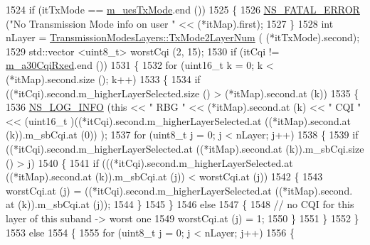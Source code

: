\begin{DoxyCode}
1524       \textcolor{keywordflow}{if} (itTxMode == \hyperlink{classns3_1_1PssFfMacScheduler_a48aa1d9dc22e9c73e3c2206be76bb6cd}{m\_uesTxMode}.end ())
1525         \{
1526           \hyperlink{group__fatal_ga5131d5e3f75d7d4cbfd706ac456fdc85}{NS\_FATAL\_ERROR} (\textcolor{stringliteral}{"No Transmission Mode info on user "} << (*itMap).first);
1527         \}
1528       \textcolor{keywordtype}{int} nLayer = \hyperlink{classns3_1_1TransmissionModesLayers_a31f608b7bfaa77440fe4cb85ad035329}{TransmissionModesLayers::TxMode2LayerNum} (
      (*itTxMode).second);
1529       std::vector <uint8\_t> worstCqi (2, 15);
1530       \textcolor{keywordflow}{if} (itCqi != \hyperlink{classns3_1_1PssFfMacScheduler_ab1bc511b7c55ead9b2e8ff1e0d4b0e3b}{m\_a30CqiRxed}.end ())
1531         \{
1532           \textcolor{keywordflow}{for} (uint16\_t k = 0; k < (*itMap).second.size (); k++)
1533             \{
1534               \textcolor{keywordflow}{if} ((*itCqi).second.m\_higherLayerSelected.size () > (*itMap).second.at (k))
1535                 \{
1536                   \hyperlink{group__logging_gafbd73ee2cf9f26b319f49086d8e860fb}{NS\_LOG\_INFO} (\textcolor{keyword}{this} << \textcolor{stringliteral}{" RBG "} << (*itMap).second.at (k) << \textcolor{stringliteral}{" CQI "} << (uint16\_t
      )((*itCqi).second.m\_higherLayerSelected.at ((*itMap).second.at (k)).m\_sbCqi.at (0)) );
1537                   \textcolor{keywordflow}{for} (uint8\_t j = 0; j < nLayer; j++)
1538                     \{
1539                       \textcolor{keywordflow}{if} ((*itCqi).second.m\_higherLayerSelected.at ((*itMap).second.at (k)).m\_sbCqi.size ()
       > j)
1540                         \{
1541                           \textcolor{keywordflow}{if} (((*itCqi).second.m\_higherLayerSelected.at ((*itMap).second.at (k)).m\_sbCqi.at
       (j)) < worstCqi.at (j))
1542                             \{
1543                               worstCqi.at (j) = ((*itCqi).second.m\_higherLayerSelected.at ((*itMap).second.
      at (k)).m\_sbCqi.at (j));
1544                             \}
1545                         \}
1546                       \textcolor{keywordflow}{else}
1547                         \{
1548                           \textcolor{comment}{// no CQI for this layer of this suband -> worst one}
1549                           worstCqi.at (j) = 1;
1550                         \}
1551                     \}
1552                 \}
1553               \textcolor{keywordflow}{else}
1554                 \{
1555                   \textcolor{keywordflow}{for} (uint8\_t j = 0; j < nLayer; j++)
1556                     \{

\end{DoxyCode}

